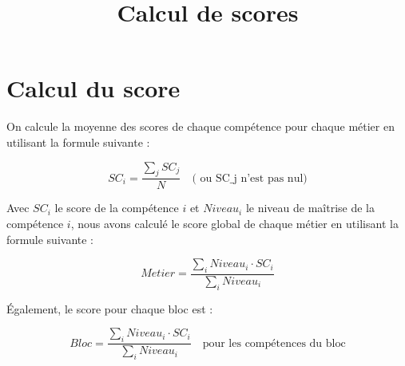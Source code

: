 \documentclass[11pt]{article}
\title{Calcul de scores}
\author{}
\date{}
\begin{document}
\maketitle

\section{Calcul du score}

On calcule la moyenne des scores de chaque compétence pour chaque métier en utilisant la formule suivante :

\[
SC_i = \frac{\sum_{j} SC_j}{N} \quad \text{( ou SC_j n'est pas nul)}
\]

Avec $SC_i$ le score de la compétence $i$ et $Niveau_i$ le niveau de maîtrise de la compétence $i$, nous avons calculé le score global de chaque métier en utilisant la formule suivante :

\[
Metier = \frac{\sum_{i} Niveau_i \cdot SC_i}{\sum_{i} Niveau_i}
\]

Également, le score pour chaque bloc est :

\[
Bloc = \frac{\sum_{i} Niveau_i \cdot SC_i}{\sum_{i} Niveau_i}
\quad \text{pour les compétences du bloc}
\]
\end{document}
